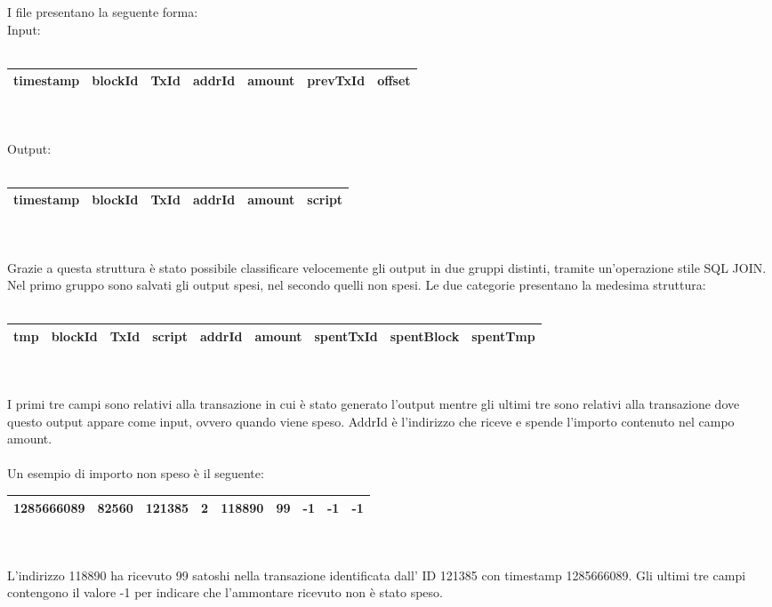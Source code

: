 I file presentano la seguente forma:\\
Input:\\\\
\begin{tabular}{|r|r|r|r|r|r|r|}
\toprule
 timestamp &  blockId &   TxId &  addrId &     amount &  prevTxId &  offset \\
\bottomrule
\end{tabular}\\\\
Output:\\\\
\begin{tabular}{|r|r|r|r|r|r|}
\toprule
 timestamp &  blockId &   TxId &  addrId &     amount &  script \\
\bottomrule
\end{tabular}\\\\
Grazie a questa struttura è stato possibile classificare velocemente gli output in due gruppi distinti, tramite un'operazione stile SQL JOIN. Nel primo gruppo sono salvati gli output spesi, nel secondo quelli non spesi. Le due categorie presentano la medesima struttura:\\\\
\begin{tabular}{|r|r|r|r|r|r|r|r|r|}
\toprule
 tmp &  blockId &   TxId &  script &  addrId &  amount &  spentTxId &  spentBlock &  spentTmp\\
\bottomrule
\end{tabular}\\\\
I primi tre campi sono relativi alla transazione in cui è stato generato l'output mentre gli ultimi tre sono relativi alla transazione dove questo output appare come input, ovvero quando viene speso. AddrId è l'indirizzo che riceve e spende l'importo contenuto nel campo amount.\\\\
Un esempio di importo non speso è il seguente:\\
\begin{tabular}{|r|r|r|r|r|r|r|r|r|}
\toprule
1285666089 &    82560 & 121385 &  2 &      118890 &       99 &         -1 &          -1 &              -1 \\
\bottomrule
\end{tabular}\\\\
L'indirizzo 118890 ha ricevuto 99 satoshi nella transazione identificata dall' ID 121385 con timestamp 1285666089. Gli ultimi tre campi contengono il valore -1 per indicare che l'ammontare ricevuto non è stato speso. \\
